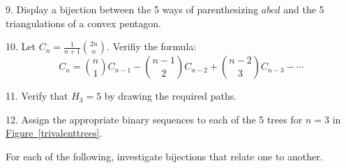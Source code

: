 \documentclass[10pt,]{book}
\theoremstyle{plain}
\theoremstyle{definition}
\theoremstyle{definition}
\numberwithin{equation}{chapter}
\begin{document}
\begin{exerciselist}
\par\smallskip
\item[9.]\hypertarget{exercise-32}{}\hypertarget{p-86}{}%
Display a bijection between the 5 ways of parenthesizing \(abcd\) and the 5 triangulations of a convex pentagon.%
\par\smallskip
\item[10.]\hypertarget{exercise-33}{}\hypertarget{p-87}{}%
Let \(C_{n} = \frac{1}{n + 1}\binom{2n}{n}.\) Verifiy the formula:%
\begin{equation*}
C_{n} = \binom{n}{1} C_{n - 1} - \binom{n - 1}{2} C_{n - 2} + \binom{n - 2}{3} C_{n - 3} - \cdots
\end{equation*}
%
\par\smallskip
\item[11.]\hypertarget{exercise-34}{}\hypertarget{p-88}{}%
Verify that \(H_{3} = 5\) by drawing the required paths.%
\par\smallskip
\item[12.]\hypertarget{exercise-35}{}\hypertarget{p-89}{}%
Assign the appropriate binary sequences to each of the 5 trees for \(n=3\) in \hyperref[trivalenttrees]{Figure~\ref{trivalenttrees}}.%
\par\smallskip
\end{exerciselist}
\hypertarget{exercisegroup-1}{}\par\noindent \hypertarget{p-90}{}%
For each of the following, investigate bijections that relate one to another.%
\end{document}
